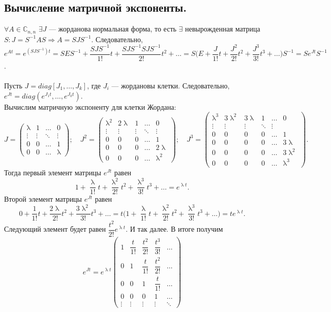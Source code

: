 \documentclass[a4paper, 12pt]{report}
\newcommand{\Cm}{\mathbb{C}}
\renewcommand{\lambda}{\uplambda}
\begin{document}
\subsection*{Вычисление матричной экспоненты.}
$\forall A \in \Cm_{n,n}$ $\exists J$ --- жорданова нормальная форма, то есть $\exists$ невырожденная матрица $S: J = S^{-1}AS \Rightarrow A = S JS^{-1}$. Следовательно, $e^{At} = e^{(SJS^{-1})t} = SES^{-1} + \dfrac{SJS^{-1}}{1!}t + \dfrac{SJS^{-1}SJS^{-1}}{2!}t^2 + \ldots = S\Big(E + \dfrac{J}{1!}t + \dfrac{J^2}{2!}t^2 + \dfrac{J^3}{3!}t^3 + \ldots\Big)S^{-1} = Se^{Jt}S^{-1}$.\\\\
Пусть $J = diag[J_1,\ldots,J_k]$, где $J_i$ --- жордановы клетки. Следовательно, $e^{Jt} = diag(e^{J_1t},\ldots,e^{J_kt})$.\\
Вычислим матричную экспоненту для клетки Жордана:
$$J = \begin{pmatrix}
	\lambda & 1 & \dots & 0\\
	\vdots & \vdots & \ddots & \vdots\\
	0 & 0 & \dots & 1\\
	0 & 0 & \dots & \lambda
\end{pmatrix};\quad J^2 = \begin{pmatrix}
\lambda^2 & 2\lambda & 1 & \dots & 0\\
\vdots & \vdots & \vdots & \ddots & \vdots\\
0 & 0 & 0 & \dots & 1\\
0 & 0 & 0 & \dots & 2\lambda\\
0 & 0 & 0 & \dots & \lambda^2
\end{pmatrix};\quad J^3 = \begin{pmatrix}
\lambda^3 & 3\lambda^2 & 3\lambda & 1 & \dots & 0\\
\vdots & \vdots & \vdots & \ddots & \vdots\\
0 & 0 & 0 & 0 & \dots & 1\\
0 & 0 & 0 & 0 & \dots & 3\lambda\\
0 & 0 & 0 & 0 & \dots & 3\lambda^2\\
0 & 0 & 0 & 0 & \dots & \lambda^3
\end{pmatrix}.$$
Тогда первый элемент матрицы $e^{Jt}$ равен $$1 + \dfrac{\lambda}{1!}t + \dfrac{\lambda^2}{2!}t^2 + \dfrac{\lambda^3}{3!}t^3 + \ldots = e^{\lambda t}.$$
Второй элемент матрицы $e^{Jt}$ равен $$0 + \dfrac{1}{1!}t + \dfrac{2\lambda}{2!}t^2 + \dfrac{3\lambda^2}{3!}t^3 + \ldots  = t \Big(1 + \dfrac{\lambda}{1!}t + \dfrac{\lambda^2}{2!}t^2 + \dfrac{\lambda^3}{3!}t^3 + \ldots\Big)= te^{\lambda t}.$$
Следующий элемент будет равен $\dfrac{t^2}{2!}e^{\lambda t}$. И так далее. В итоге получим
$$e^{Jt} = e^{\lambda t}\begin{pmatrix}
	1 & \dfrac{t}{1!} & \dfrac{t^2}{2!} & \dfrac{t^3}{3!} & \dots\\
	0 & 1 & \dfrac{t}{1!} & \dfrac{t^2}{2!} & \dots\\
	0 & 0 & 1 & \dfrac{t}{1!} & \dots\\
	0 & 0 & 0 & 1 & \dots\\
	\vdots & \vdots & \vdots & \vdots & \ddots
\end{pmatrix}$$
\end{document}
